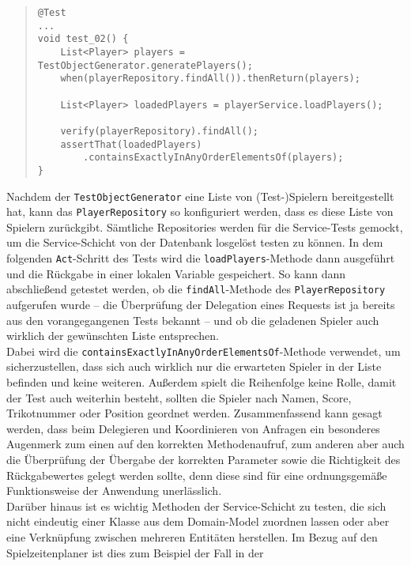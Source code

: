 \begin{quote}
\begin{verbatim}
@Test
...
void test_02() {
    List<Player> players = TestObjectGenerator.generatePlayers();
    when(playerRepository.findAll()).thenReturn(players);

    List<Player> loadedPlayers = playerService.loadPlayers();

    verify(playerRepository).findAll();
    assertThat(loadedPlayers)
        .containsExactlyInAnyOrderElementsOf(players);
}
\end{verbatim}
\end{quote}

Nachdem der \texttt{TestObjectGenerator} eine Liste von (Test-)Spielern 
bereitgestellt hat, kann das \texttt{PlayerRepository} so konfiguriert werden, dass 
es diese Liste von Spielern zurückgibt. Sämtliche Repositories werden für die 
Service-Tests gemockt, um die Service-Schicht von der Datenbank losgelöst testen zu 
können. In dem folgenden \texttt{Act}-Schritt des Tests wird die 
\texttt{loadPlayers}-Methode dann ausgeführt und die Rückgabe in einer lokalen 
Variable gespeichert. So kann dann abschließend getestet werden, ob die 
\texttt{findAll}-Methode des \texttt{PlayerRepository} aufgerufen wurde -- die 
Überprüfung der Delegation eines Requests ist ja bereits aus den vorangegangenen 
Tests bekannt -- und ob die geladenen Spieler auch wirklich der gewünschten Liste 
entsprechen. \\ 
Dabei wird die 
\texttt{containsExactlyInAnyOrderElementsOf}-Methode verwendet, um 
sicherzustellen, dass sich auch wirklich nur die erwarteten Spieler in der Liste 
befinden und keine weiteren. Außerdem spielt die Reihenfolge keine Rolle, damit der 
Test auch weiterhin besteht, sollten die Spieler nach Namen, Score, Trikotnummer oder 
Position geordnet werden. 
Zusammenfassend kann gesagt werden, dass beim Delegieren und Koordinieren von 
Anfragen ein besonderes Augenmerk zum einen auf den korrekten Methodenaufruf, zum 
anderen aber auch die Überprüfung der Übergabe der korrekten Parameter sowie 
die Richtigkeit des Rückgabewertes gelegt werden sollte, denn diese sind für eine 
ordnungsgemäße Funktionsweise der Anwendung unerlässlich. \\ 
Darüber hinaus ist es wichtig Methoden der Service-Schicht zu testen, die sich nicht 
eindeutig einer Klasse aus dem Domain-Model zuordnen lassen oder aber eine 
Verknüpfung zwischen mehreren Entitäten herstellen. Im Bezug auf den 
Spielzeitenplaner ist dies zum Beispiel der Fall in der
